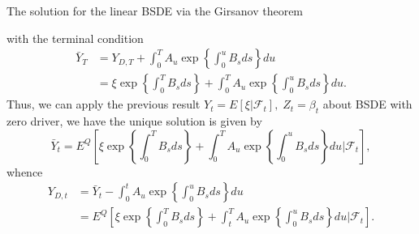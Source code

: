 \documentclass{beamer}
\begin{document}
\begin{frame}{The solution for the linear BSDE via the Girsanov theorem}

    {\footnotesize \footnotesize
    with the terminal condition
    \begin{align*}
        \bar{Y}_T &= Y_{D,T} + \int_0^T A_u \exp \left\{ \int_0^u B_s ds \right\} du\\
        &= \xi \exp \left\{ \int_0^T B_s ds \right\} + \int_0^T A_u 
\exp \left\{ \int_0^u B_s ds \right\} du.
    \end{align*}
     \pause Thus, we can apply the previous result 
    $Y_t = E[\xi|\mathcal{F}_t], \;Z_t = \beta_t$ about BSDE with zero driver, we have the unique solution is given by
\[
\bar{Y}_t = E^Q \left[ \xi \exp \left\{ \int_0^T B_s ds \right\} + \int_0^T A_u \exp \left\{ \int_0^u B_s ds \right\} du | \mathcal{F}_t \right],
\]
 \pause whence
\begin{align*}
    Y_{D,t} &= \bar{Y}_t - \int_0^t A_u \exp \left\{ \int_0^u B_s ds \right\} du\\
    &= E^Q \left[ \xi \exp \left\{ \int_0^T B_s ds \right\} +
 \int_t^T A_u \exp \left\{ \int_0^u B_s ds \right\} du | \mathcal{F}_t \right].
\end{align*}
    }
    
\end{frame}
\end{document}
